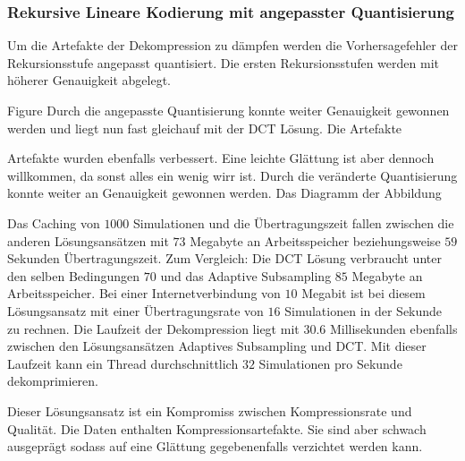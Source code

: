 \subsubsection{Rekursive Lineare Kodierung mit angepasster Quantisierung}
Um die Artefakte der Dekompression zu dämpfen werden die Vorhersagefehler der Rekursionsstufe angepasst quantisiert. Die ersten Rekursionsstufen werden mit höherer Genauigkeit abgelegt.

Figure
Durch die angepasste Quantisierung konnte weiter Genauigkeit gewonnen werden und liegt nun fast gleichauf mit der DCT Lösung. Die Artefakte 

Artefakte wurden ebenfalls verbessert. Eine leichte Glättung ist aber dennoch willkommen, da sonst alles ein wenig wirr ist.
Durch die veränderte Quantisierung konnte weiter an Genauigkeit gewonnen werden. Das Diagramm der Abbildung



Das Caching von $1000$ Simulationen und die Übertragungszeit fallen zwischen die anderen Lösungsansätzen mit $73$ Megabyte an Arbeitsspeicher beziehungsweise $59$ Sekunden Übertragungszeit. Zum Vergleich: Die DCT Lösung verbraucht unter den selben Bedingungen $70$ und das Adaptive Subsampling $85$ Megabyte an Arbeitsspeicher. Bei einer Internetverbindung von $10$ Megabit ist bei diesem Lösungsansatz mit einer Übertragungsrate von $16$ Simulationen in der Sekunde zu rechnen. Die Laufzeit der Dekompression liegt mit $30.6$ Millisekunden ebenfalls zwischen den Lösungsansätzen Adaptives Subsampling und DCT. Mit dieser Laufzeit kann ein Thread durchschnittlich $32$ Simulationen pro Sekunde dekomprimieren.

Dieser Lösungsansatz ist ein Kompromiss zwischen Kompressionsrate und Qualität. Die Daten enthalten Kompressionsartefakte. Sie sind aber schwach ausgeprägt sodass auf eine Glättung gegebenenfalls verzichtet werden kann.